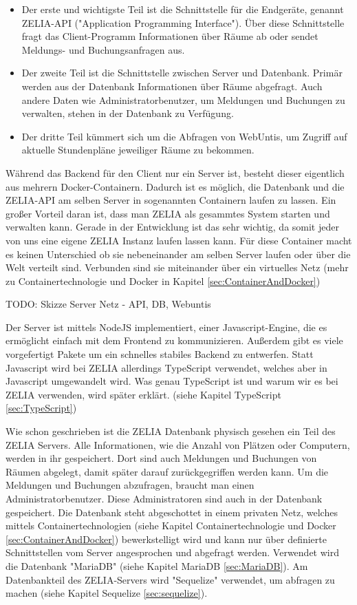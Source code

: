 \begin{itemize}
    \item Der erste und wichtigste Teil ist die Schnittstelle für die Endgeräte, genannt ZELIA-API ("Application Programming Interface"). Über diese Schnittstelle fragt das Client-Programm Informationen über Räume ab oder sendet Meldungs- und Buchungsanfragen aus.
    \item Der zweite Teil ist die Schnittstelle zwischen Server und Datenbank. Primär werden aus der Datenbank Informationen über Räume abgefragt. Auch andere Daten wie Administratorbenutzer, um Meldungen und Buchungen zu verwalten, stehen in der Datenbank zu Verfügung. 
    \item Der dritte Teil kümmert sich um die Abfragen von WebUntis, um Zugriff auf aktuelle Stundenpläne jeweiliger Räume zu bekommen.
\end{itemize}

Während das Backend für den Client nur ein Server ist, besteht dieser eigentlich aus mehrern Docker-Containern. Dadurch ist es möglich, die Datenbank und die ZELIA-API am selben Server in sogenannten Containern laufen zu lassen. Ein großer Vorteil daran ist, dass man ZELIA als gesammtes System starten und verwalten kann. Gerade in der Entwicklung ist das sehr wichtig, da somit jeder von uns eine eigene ZELIA Instanz laufen lassen kann. Für diese Container macht es keinen Unterschied ob sie nebeneinander am selben Server laufen oder über die Welt verteilt sind. Verbunden sind sie miteinander über ein virtuelles Netz (mehr zu Containertechnologie und Docker in Kapitel \ref{sec:ContainerAndDocker})

TODO: Skizze Server Netz - API, DB, Webuntis

Der Server ist mittels NodeJS implementiert, einer Javascript-Engine, die es ermöglicht einfach mit dem Frontend zu kommunizieren. Außerdem gibt es viele vorgefertigt Pakete um ein schnelles stabiles Backend zu entwerfen. Statt Javascript wird bei ZELIA allerdings TypeScript verwendet, welches aber in Javascript umgewandelt wird. Was genau TypeScript ist und warum wir es bei ZELIA verwenden, wird später erklärt. (siehe Kapitel TypeScript \ref{sec:TypeScript})


Wie schon geschrieben ist die ZELIA Datenbank physisch gesehen ein Teil des ZELIA Servers. Alle Informationen, wie die Anzahl von Plätzen oder Computern, werden in ihr gespeichert. Dort sind auch Meldungen und Buchungen von Räumen abgelegt, damit später darauf zurückgegriffen werden kann. Um die Meldungen und Buchungen abzufragen, braucht man einen Administratorbenutzer. Diese Administratoren sind auch in der Datenbank gespeichert. Die Datenbank steht abgeschottet in einem privaten Netz, welches mittels Containertechnologien (siehe Kapitel Containertechnologie und Docker \ref{sec:ContainerAndDocker}) bewerkstelligt wird und kann nur über definierte Schnittstellen vom Server angesprochen und abgefragt werden. Verwendet wird die Datenbank "MariaDB" (siehe Kapitel MariaDB \ref{sec:MariaDB}). Am Datenbankteil des ZELIA-Servers wird "Sequelize" verwendet, um abfragen zu machen (siehe Kapitel Sequelize \ref{sec:sequelize}).


